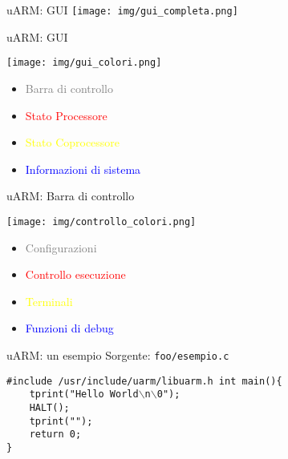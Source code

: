 \documentclass{beamer}
\begin{document}
\begin{frame}{uARM: GUI}
\centering
\texttt{[image: img/gui\_completa.png]}
\end{frame}

\begin{frame}{uARM: GUI}
\begin{center}
\texttt{[image: img/gui\_colori.png]}
\end{center}

{\footnotesize
\begin{itemize}\itemsep1pt
\item \textcolor{gray}{Barra di controllo}
\item \textcolor{red}{Stato Processore}
\item \textcolor{yellow}{Stato Coprocessore}
\item \textcolor{blue}{Informazioni di sistema}
\end{itemize}}
\end{frame}

\begin{frame}{uARM: Barra di controllo}

\begin{center}
\texttt{[image: img/controllo\_colori.png]}
\end{center}

\vfill

{\footnotesize
\begin{itemize}\itemsep1pt
\item \textcolor{gray}{Configurazioni}
\item \textcolor{red}{Controllo esecuzione}
\item \textcolor{yellow}{Terminali}
\item \textcolor{blue}{Funzioni di debug}
\end{itemize}}
\end{frame}

\begin{frame}{uARM: un esempio}
Sorgente: \texttt{foo/esempio.c}

\vspace{20px}
\begin{framed}
\small\texttt{\#include /usr/include/uarm/libuarm.h\newline
\newline
int main()\{\\
~~~~tprint("Hello World$\backslash$n$\backslash$0");\\
~~~~HALT();\\
~~~~tprint("");\\
~~~~return 0;\\
\} }
\end{framed}
\end{frame}
\end{document}
